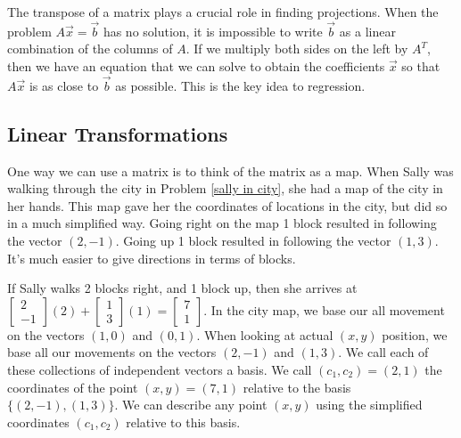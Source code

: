 \documentclass[letterpaper,oneside]{book}%
\theoremstyle{plain}
\theoremstyle{box}
\theoremstyle{problem}
\newcommand{\bvec}[1]{\begin{bmatrix} #1 \end{bmatrix}}
\begin{document}
 The transpose of a matrix plays a crucial role in finding projections. When the problem $A\vec x =\vec b$ has no solution, it is impossible to write $\vec b$ as a linear combination of the columns of $A$.  If we multiply both sides on the left by $A^T$, then we have an equation that we can solve to obtain the coefficients $\vec x$ so that $A\vec x$ is as close to $\vec b$ as possible. This is the key idea to regression. 


\subsection*{Linear Transformations}
One way we can use a matrix is to think of the matrix as a map. When Sally was walking through the city in Problem \ref{sally in city}, she had a map of the city in her hands.  This map gave her the coordinates of locations in the city, but did so in a much simplified way. Going right on the map 1 block resulted in following the vector $(2,-1)$.  Going up 1 block resulted in following the vector $(1,3)$. It's much easier to give directions in terms of blocks.  

If Sally walks 2 blocks right, and 1 block up, then she arrives at $\bvec{2\\-1}(2)+\bvec{1\\3}(1) = \bvec{7\\1}$. In the city map, we base our all movement on the vectors $(1,0)$ and $(0,1)$. When looking at actual $(x,y)$ position, we base all our movements on the vectors $(2,-1)$ and $(1,3)$. We call each of these collections of independent vectors a basis.  We call $(c_1,c_2)=(2,1)$ the coordinates of the point $(x,y)=(7,1)$ relative to the basis $\{(2,-1),(1,3)\}$. 
We can describe any point $(x,y)$ using the simplified coordinates $(c_1,c_2)$ relative to this basis.
\end{document}
